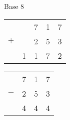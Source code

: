 \documentclass{article}
\begin{document}
\begin{description}
Base 8
\begin{tabular}{rrrrr}
      &       &     7 &     1 &     7\\
  $+$ &       &     2 &     5 &     3\\
\hline
      &     1 &     1 &     7 &     2\\
\end{tabular}
\hspace{1in}
\begin{tabular}{rrrr}
      &     7 &     1 &     7\\
  $-$ &     2 &     5 &     3\\
\hline
      &     4 &     4 &     4\\
\end{tabular}
\end{description}
\end{document}
